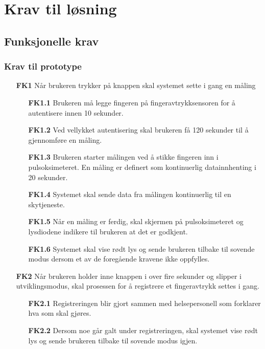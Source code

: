 \chapter{Krav til løsning}
\label{ch:requirements}

\section{Funksjonelle krav}

\subsection{Krav til prototype}

\begin{enumerate}
    \item [\textbf{FK1}] Når brukeren trykker på knappen skal systemet sette i gang en måling
        \begin{enumerate}
          \item [\textbf{FK1.1}] Brukeren må legge fingeren på fingeravtrykksensoren for å autentisere innen 10 sekunder.
          \item [\textbf{FK1.2}] Ved vellykket autentisering skal brukeren få 120 sekunder til å gjennomføre
              en måling.
          \item [\textbf{FK1.3}] Brukeren starter målingen ved å stikke fingeren inn i pulsoksimeteret.
              En måling er definert som kontinuerlig datainnhenting i 20 sekunder.
          \item [\textbf{FK1.4}] Systemet skal sende data fra målingen kontinuerlig til en skytjeneste.
          \item [\textbf{FK1.5}] Når en måling er ferdig, skal skjermen på pulsoksimeteret og lysdiodene indikere til brukeren
              at det er godkjent.
          \item [\textbf{FK1.6}]Systemet skal vise rødt lys og sende brukeren tilbake til sovende modus dersom et av de
              foregående kravene ikke oppfylles.
        \end{enumerate}
    \item [\textbf{FK2}] Når brukeren holder inne knappen i over fire sekunder og slipper i utviklingsmodus,
        skal prosessen for å registrere et fingeravtrykk settes i gang.
        \begin{enumerate}
          \item [\textbf{FK2.1}] Registreringen blir gjort sammen med helsepersonell som forklarer hva som skal gjøres.
          \item [\textbf{FK2.2}] Dersom noe går galt under registreringen, skal systemet vise rødt lys og sende brukeren
              tilbake til sovende modus igjen.
        \end{enumerate}
\end{enumerate}

